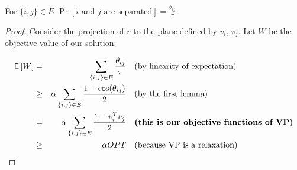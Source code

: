 \begin{lemma}
	For $\{i,j\} \in E$ $\Pr [i \text{ and } j \text{ are separated}] = \frac{\theta_{ij}}{\pi}$.
\end{lemma}

\begin{proof}
	Consider the projection of $r$ to the plane defined by $v_i$, $v_j$. Let $W$ be the objective value of our solution:
	
	$$
	\begin{aligned}
		\operatorname{\textsf{E}\,} [W] & =    & \sum_{\{i,j\} \in E} \frac{\theta_{ij}}{\pi} & \quad \text{(by linearity of expectation)} \\
		       & \geq & \alpha \sum_{\{i,j\} \in E} \frac{1 - \cos (\theta_{ij})}{2} & \quad \text{(by the first lemma)} \\
		       & =    & \alpha \sum_{\{i,j\} \in E} \frac{1 - v_{i}^T v_{j}}{2} & \quad \textbf{(this is our objective functions of VP)} \\
		       & \geq & \alpha OPT & \quad \text{(because VP is a relaxation)}
	\end{aligned}
	$$
\end{proof}